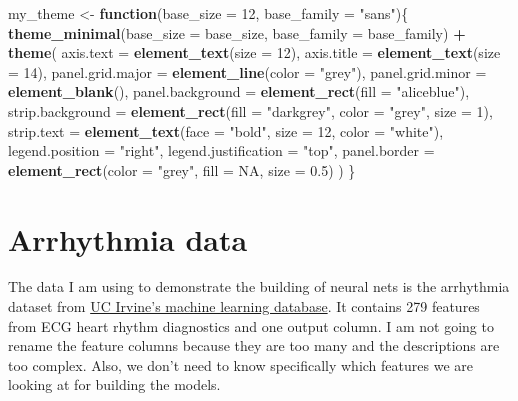 \documentclass[]{book}
\newenvironment{Shaded}{\begin{snugshade}}{\end{snugshade}}
\newcommand{\ControlFlowTok}[1]{\textcolor[rgb]{0.13,0.29,0.53}{\textbf{#1}}}
\newcommand{\DataTypeTok}[1]{\textcolor[rgb]{0.13,0.29,0.53}{#1}}
\newcommand{\DecValTok}[1]{\textcolor[rgb]{0.00,0.00,0.81}{#1}}
\newcommand{\FloatTok}[1]{\textcolor[rgb]{0.00,0.00,0.81}{#1}}
\newcommand{\KeywordTok}[1]{\textcolor[rgb]{0.13,0.29,0.53}{\textbf{#1}}}
\newcommand{\NormalTok}[1]{#1}
\newcommand{\OperatorTok}[1]{\textcolor[rgb]{0.81,0.36,0.00}{\textbf{#1}}}
\newcommand{\OtherTok}[1]{\textcolor[rgb]{0.56,0.35,0.01}{#1}}
\newcommand{\StringTok}[1]{\textcolor[rgb]{0.31,0.60,0.02}{#1}}
\begin{document}
\begin{Shaded}
\begin{Highlighting}[]
\NormalTok{my_theme <-}\StringTok{ }\ControlFlowTok{function}\NormalTok{(}\DataTypeTok{base_size =} \DecValTok{12}\NormalTok{, }\DataTypeTok{base_family =} \StringTok{"sans"}\NormalTok{)\{}
  \KeywordTok{theme_minimal}\NormalTok{(}\DataTypeTok{base_size =}\NormalTok{ base_size, }\DataTypeTok{base_family =}\NormalTok{ base_family) }\OperatorTok{+}
\StringTok{  }\KeywordTok{theme}\NormalTok{(}
    \DataTypeTok{axis.text =} \KeywordTok{element_text}\NormalTok{(}\DataTypeTok{size =} \DecValTok{12}\NormalTok{),}
    \DataTypeTok{axis.title =} \KeywordTok{element_text}\NormalTok{(}\DataTypeTok{size =} \DecValTok{14}\NormalTok{),}
    \DataTypeTok{panel.grid.major =} \KeywordTok{element_line}\NormalTok{(}\DataTypeTok{color =} \StringTok{"grey"}\NormalTok{),}
    \DataTypeTok{panel.grid.minor =} \KeywordTok{element_blank}\NormalTok{(),}
    \DataTypeTok{panel.background =} \KeywordTok{element_rect}\NormalTok{(}\DataTypeTok{fill =} \StringTok{"aliceblue"}\NormalTok{),}
    \DataTypeTok{strip.background =} \KeywordTok{element_rect}\NormalTok{(}\DataTypeTok{fill =} \StringTok{"darkgrey"}\NormalTok{, }\DataTypeTok{color =} \StringTok{"grey"}\NormalTok{, }\DataTypeTok{size =} \DecValTok{1}\NormalTok{),}
    \DataTypeTok{strip.text =} \KeywordTok{element_text}\NormalTok{(}\DataTypeTok{face =} \StringTok{"bold"}\NormalTok{, }\DataTypeTok{size =} \DecValTok{12}\NormalTok{, }\DataTypeTok{color =} \StringTok{"white"}\NormalTok{),}
    \DataTypeTok{legend.position =} \StringTok{"right"}\NormalTok{,}
    \DataTypeTok{legend.justification =} \StringTok{"top"}\NormalTok{, }
    \DataTypeTok{panel.border =} \KeywordTok{element_rect}\NormalTok{(}\DataTypeTok{color =} \StringTok{"grey"}\NormalTok{, }\DataTypeTok{fill =} \OtherTok{NA}\NormalTok{, }\DataTypeTok{size =} \FloatTok{0.5}\NormalTok{)}
\NormalTok{  )}
\NormalTok{\}}
\end{Highlighting}
\end{Shaded}

\hypertarget{arrhythmia-data}{%
\section{Arrhythmia data}\label{arrhythmia-data}}

The data I am using to demonstrate the building of neural nets is the arrhythmia dataset from \href{https://archive.ics.uci.edu/ml/datasets/Arrhythmia}{UC Irvine's machine learning database}. It contains 279 features from ECG heart rhythm diagnostics and one output column. I am not going to rename the feature columns because they are too many and the descriptions are too complex. Also, we don't need to know specifically which features we are looking at for building the models.
\end{document}
